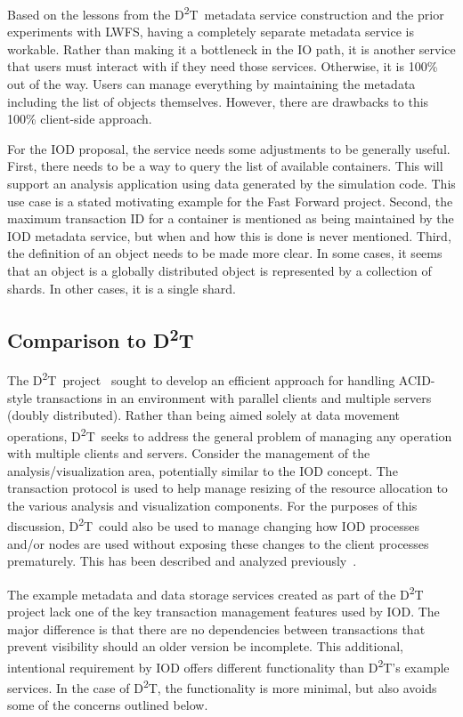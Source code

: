 \documentclass[conference]{sig-alt-gov2}
\newcommand{\DDT}{D\textsuperscript{2}T~}
\newcommand{\DDTns}{D\textsuperscript{2}T}
\begin{document}
Based on the lessons from the \DDT metadata service construction and the prior
experiments with LWFS, having a completely separate metadata service is
workable. Rather than making it a bottleneck in the IO path, it is another
service that users must interact with if they need those services. Otherwise,
it is 100\% out of the way. Users can manage everything by maintaining the
metadata including the list of objects themselves. However, there are drawbacks
to this 100\% client-side approach.

For the IOD proposal, the service needs some adjustments to be generally
useful.  First, there needs to be a way to query the list of available
containers. This will support an analysis application using data generated by
the simulation code. This use case is a stated motivating example for the Fast
Forward project. Second, the maximum transaction ID for a container is
mentioned as being maintained by the IOD metadata service, but when and how
this is done is never mentioned.  Third, the definition of an object needs to
be made more clear. In some cases, it seems that an object is a globally
distributed object is represented by a collection of shards. In other cases, it
is a single shard.

\subsection{Comparison to \DDTns}
The \DDT project~\cite{lofstead:2012:txn} sought to develop an efficient
approach for handling ACID-style transactions in an environment with parallel
clients and multiple servers (doubly distributed). Rather than being aimed
solely at data movement operations, \DDT seeks to address the general problem
of managing any operation with multiple clients and servers.  Consider the
management of the analysis/visualization area, potentially similar to the IOD
concept. The transaction protocol is used to help manage resizing of the
resource allocation to the various analysis and visualization components.  For
the purposes of this discussion, \DDT could also be used to manage changing how
IOD processes and/or nodes are used without exposing these changes to the
client processes prematurely.  This has been described and analyzed
previously~\cite{dayal:2013:io-containers}.

The example metadata and data storage services created as part of the \DDT
project lack one of the key transaction management features used by IOD.
The major difference is that there are no dependencies between transactions
that prevent visibility should an older version be incomplete. This additional,
intentional requirement by IOD offers different functionality than \DDTns's
example services. In the case of \DDTns, the functionality is more minimal, but
also avoids some of the concerns outlined below.
\end{document}
